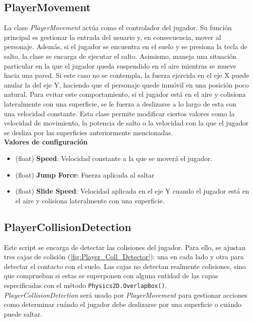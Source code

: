 \subsection{PlayerMovement}

La clase \textit{PlayerMovement} actúa como el controlador del jugador. Su función principal es gestionar la entrada del usuario y, en consecuencia, mover al personaje. Además, si el jugador se encuentra en el suelo y se presiona la tecla de salto, la clase se encarga de ejecutar el salto.
Asimismo, maneja una situación particular en la que el jugador queda suspendido en el aire mientras se mueve hacia una pared. Si este caso no se contempla, la fuerza ejercida en el eje X puede anular la del eje Y, haciendo que el personaje quede inmóvil en una posición poco natural. Para evitar este comportamiento, si el jugador está en el aire y colisiona lateralmente con una superficie, se le fuerza a deslizarse a lo largo de esta con una velocidad constante.
Esta clase permite modificar ciertos valores como la velocidad de movimiento, la potencia de salto o la velocidad con la que el jugador se desliza por las superficies anteriormente mencionadas.\\

\textbf{Valores de configuración}
\begin{itemize}
	\item (float) \textbf{Speed}: Velocidad constante a la que se moverá el jugador.
	\item (float) \textbf{Jump Force}: Fuerza aplicada al saltar
	\item (float) \textbf{Slide Speed}: Velocidad aplicada en el eje Y cuando el jugador está en el aire y colisiona lateralmente con una superficie.
\end{itemize}

\subsection{PlayerCollisionDetection}

Este script se encarga de detectar las colisiones del jugador. Para ello, se ajustan tres cajas de colisión (\autoref{fig:Player_Coll_Detector}): una en cada lado y otra para detectar el contacto con el suelo. Las cajas no detectan realmente colisiones, sino que comprueban si estas se superponen con alguna entidad de las capas especificadas con el método \texttt{Physics2D.OverlapBox()}.\\

\textit{PlayerCollisionDetection} será usado por \textit{PlayerMovement} para gestionar acciones como determinar cuándo el jugador debe deslizarse por una superficie o cuándo puede saltar.\\


